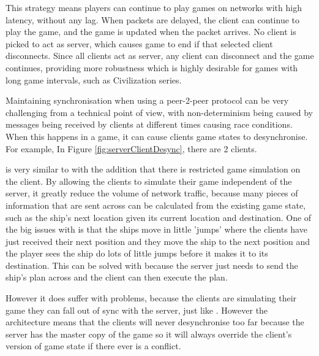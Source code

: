 This strategy means players can continue to play games on networks with high latency, without any lag. When packets are delayed, the client can continue to play the game, and the game is updated when the packet arrives.
No client is picked to act as server, which causes game to end if that selected client disconnects.
Since all clients act as server, any client can disconnect and the game continues, providing more robustness which is highly desirable for games with long game intervals, such as Civilization series\cite{civilizationInMyPants}.



Maintaining synchronisation when using a peer-2-peer protocol can be very challenging from a technical point of view, with non-determinism being caused by messages being received by clients at different times causing race conditions.
When this happens in a game, it can cause clients game states to desynchronise.
For example, In Figure \ref{fig:serverClientDesync}, there are 2 clients.


\empth{\stepThreeName} is very similar to \stepTwoName with the addition that there is restricted game simulation on the client.
By allowing the clients to simulate their game independent of the server, it greatly reduce the volume of network traffic, because many pieces of information that are sent across can be calculated from the existing game state, such as the ship's next location given its current location and destination.
One of the big issues with \stepTwoName is that the ships move in little 'jumps' where the clients have just received their next position and they move the ship to the next position and the player sees the ship do lots of little jumps before it makes it to its destination. This can be solved with \stepThreeName because the server just needs to send the ship's plan across and the client can then execute the plan.

However it does suffer with problems, because the clients are simulating their game they can fall out of sync with the server, just like \stepOneName. However the architecture means that the clients will never desynchronise too far because the server has the master copy of the game so it will always override the client's version of game state if there ever is a conflict.


